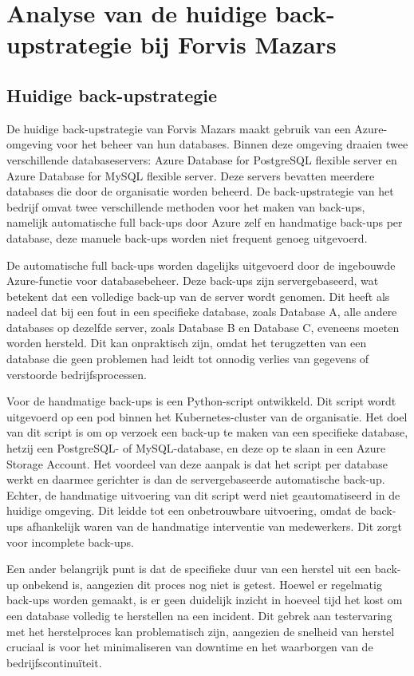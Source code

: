 \chapter{Analyse van de huidige back-upstrategie bij Forvis Mazars}
\section{Huidige back-upstrategie}
De huidige back-upstrategie van Forvis Mazars maakt gebruik van een Azure-omgeving voor het beheer van hun databases. Binnen deze omgeving draaien twee verschillende databaseservers: Azure Database for PostgreSQL flexible server en Azure Database for MySQL flexible server. Deze servers bevatten meerdere databases die door de organisatie worden beheerd. De back-upstrategie van het bedrijf omvat twee verschillende methoden voor het maken van back-ups, namelijk automatische full back-ups door Azure zelf en handmatige back-ups per database, deze manuele back-ups worden niet frequent genoeg uitgevoerd.

De automatische full back-ups worden dagelijks uitgevoerd door de ingebouwde Azure-functie voor databasebeheer. Deze back-ups zijn servergebaseerd, wat betekent dat een volledige back-up van de server wordt genomen. Dit heeft als nadeel dat bij een fout in een specifieke database, zoals Database A, alle andere databases op dezelfde server, zoals Database B en Database C, eveneens moeten worden hersteld. Dit kan onpraktisch zijn, omdat het terugzetten van een database die geen problemen had leidt tot onnodig verlies van gegevens of verstoorde bedrijfsprocessen.

Voor de handmatige back-ups is een Python-script ontwikkeld. Dit script wordt uitgevoerd op een pod binnen het Kubernetes-cluster van de organisatie. Het doel van dit script is om op verzoek een back-up te maken van een specifieke database, hetzij een PostgreSQL- of MySQL-database, en deze op te slaan in een Azure Storage Account. Het voordeel van deze aanpak is dat het script per database werkt en daarmee gerichter is dan de servergebaseerde automatische back-up. Echter, de handmatige uitvoering van dit script werd niet geautomatiseerd in de huidige omgeving. Dit leidde tot een onbetrouwbare uitvoering, omdat de back-ups afhankelijk waren van de handmatige interventie van medewerkers. Dit zorgt voor incomplete back-ups.

Een ander belangrijk punt is dat de specifieke duur van een herstel uit een back-up onbekend is, aangezien dit proces nog niet is getest. Hoewel er regelmatig back-ups worden gemaakt, is er geen duidelijk inzicht in hoeveel tijd het kost om een database volledig te herstellen na een incident. Dit gebrek aan testervaring met het herstelproces kan problematisch zijn, aangezien de snelheid van herstel cruciaal is voor het minimaliseren van downtime en het waarborgen van de bedrijfscontinuïteit.

